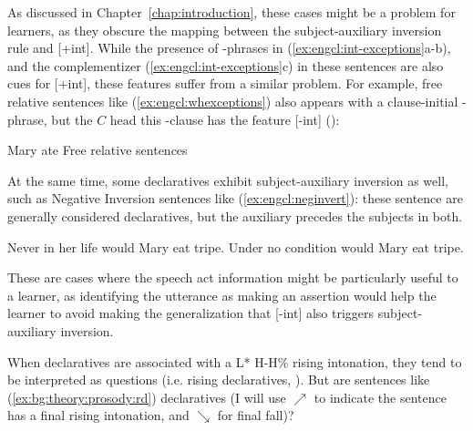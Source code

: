 As discussed in Chapter~\ref{chap:introduction}, these cases might be a problem for learners, as they obscure the mapping between the subject-auxiliary inversion rule and [+int]. While the presence of \twh-phrases in (\ref{ex:engcl:int-exceptions}a-b), and the complementizer  (\ref{ex:engcl:int-exceptions}c) in these sentences are also cues for [+int], these features suffer from a similar problem. For example, free relative sentences like (\ref{ex:engcl:whexceptions}) also appears with a clause-initial \twh-phrase, but the $C$ head this \twh-clause has the feature [-int] (\cite{bresnan1978free, caponigro2003free}):

Mary ate  \hfill Free relative sentences
\eex


At the same time, some declaratives exhibit subject-auxiliary inversion as well, such as Negative Inversion sentences like (\ref{ex:engcl:neginvert}): these sentence are generally considered declaratives, but the auxiliary  precedes the subjects in both.

\bxl{}
Never in her life would Mary eat tripe.
\ex
Under no condition would Mary eat tripe.
\exl
\eex

These are cases where the speech act information might be particularly useful to a learner, as identifying the utterance as making an assertion would help the learner to avoid making the generalization that [-int] also triggers subject-auxiliary inversion. 

 When declaratives are associated with a  L* H-H\% rising intonation, they tend to be interpreted as questions (i.e. rising declaratives, \citealt{ladd1981,gunlogson2004,gunlogson2008,jeong2018,rudin2018,goodhue2021rd}). But are sentences like (\ref{ex:bg:theory:prosody:rd}) declaratives (I will use $\nearrow$ to indicate the sentence has a final rising intonation, and $\searrow$ for final fall)?
 
